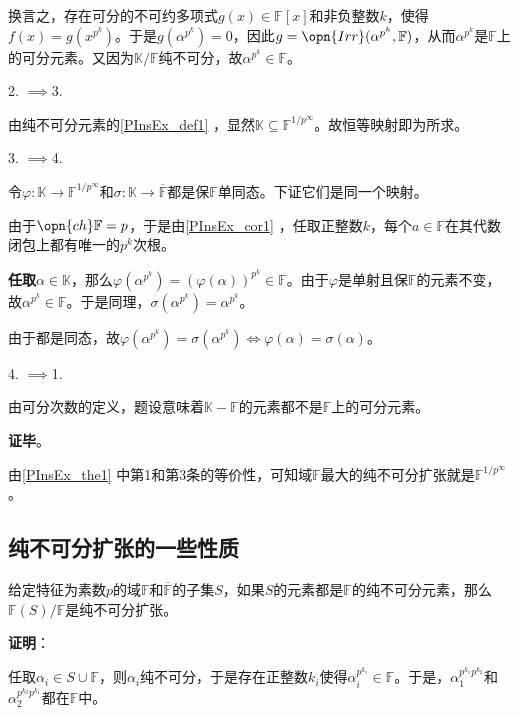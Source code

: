 换言之，存在可分的不可约多项式$g(x)\in\mathbb{F}[x]$和非负整数$k$，使得$f(x)=g(x^{p^k})$。于是$g(\alpha^{p^k})=0$，因此$g=\opn{Irr}(\alpha^{p^k}, \mathbb{F})$，从而$\alpha^{p^k}$是$\mathbb{F}$上的可分元素。又因为$\mathbb{K}/\mathbb{F}$纯不可分，故$\alpha^{p^k}\in\mathbb{F}$。


2. $\implies$3. 

由纯不可分元素的\autoref{PInsEx_def1} ，显然$\mathbb{K}\subseteq\mathbb{F}^{1/p^\infty}$。故恒等映射即为所求。

3. $\implies$4. 

令$\varphi:\mathbb{K}\to\mathbb{F}^{1/p^\infty}$和$\sigma:\mathbb{K}\to\overline{\mathbb{F}}$都是保$\mathbb{F}$单同态。下证它们是同一个映射。

由于$\opn{ch}\mathbb{F}=p$，于是由\autoref{PInsEx_cor1} ，任取正整数$k$，每个$a\in\mathbb{F}$在其代数闭包上都有唯一的$p^k$次根。

\textbf{任取}$\alpha\in\mathbb{K}$，那么$\varphi(\alpha^{p^k})=(\varphi(\alpha))^{p^k}\in\mathbb{F}$。由于$\varphi$是单射且保$\mathbb{F}$的元素不变，故$\alpha^{p^k}\in\mathbb{F}$。于是同理，$\sigma(\alpha^{p^k})=\alpha^{p^k}$。

由于都是同态，故$\varphi(\alpha^{p^k})=\sigma(\alpha^{p^k})\iff \varphi(\alpha)=\sigma(\alpha)$。

4. $\implies$1. 

由可分次数的定义，题设意味着$\mathbb{K}-\mathbb{F}$的元素都不是$\mathbb{F}$上的可分元素。


\textbf{证毕}。

由\autoref{PInsEx_the1} 中第1和第3条的等价性，可知域$\mathbb{F}$最大的纯不可分扩张就是$\mathbb{F}^{1/p^\infty}$。





\subsection{纯不可分扩张的一些性质}


\begin{theorem}{}
给定特征为素数$p$的域$\mathbb{F}$和$\overline{\mathbb{F}}$的子集$S$，如果$S$的元素都是$\mathbb{F}$的纯不可分元素，那么$\mathbb{F}(S)/\mathbb{F}$是纯不可分扩张。
\end{theorem}

\textbf{证明}：

任取$\alpha_i\in S\cup\mathbb{F}$，则$\alpha_i$纯不可分，于是存在正整数$k_i$使得$\alpha_i^{p^{k_i}}\in\mathbb{F}$。于是，$\alpha_1^{p^{k_1}p^{k_2}}$和$\alpha_2^{p^{k_2}p^{k_1}}$都在$\mathbb{F}$中。

